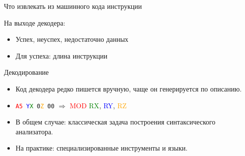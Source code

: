 \documentclass{beamer}
\begin{document}
\begin{frame}{Что извлекать из машинного кода инструкции}
\begin{center}
\end{center}

На выходе декодера: 
\begin{itemize}
\item Успех, неуспех, недостаточно данных
\item Для успеха: длина инструкции
\end{itemize}
\end{frame}







\begin{frame}{Декодирование}
\begin{itemize}
\item Код декодера редко пишется вручную, чаще он генерируется по описанию.
\item \texttt{\textcolor{red}{A5} \textcolor{blue}{Y}\textcolor{green}{X} 0\textcolor{orange}{Z} 00} $\Rightarrow$ \textcolor{red}{MOD} \textcolor{green}{RX}, \textcolor{blue}{RY}, \textcolor{orange}{RZ}
\item В общем случае: классическая задача построения  синтаксического анализатора.
\item На практике: специализированные инструменты и языки.
\end{itemize}
\end{frame}
\end{document}
